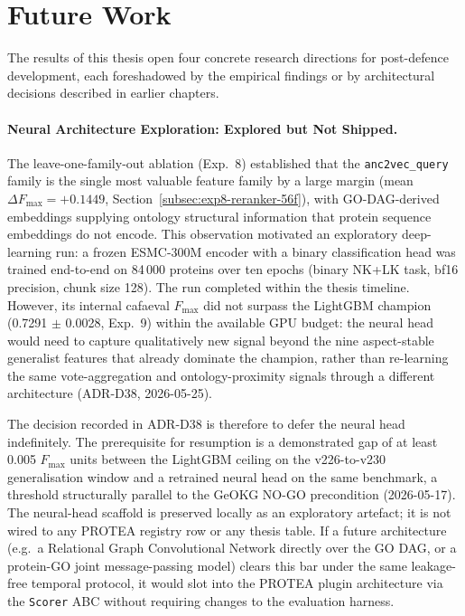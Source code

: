 \section{Future Work}
\label{sec:conclusion-future-work}

The results of this thesis open four concrete research directions for
post-defence development, each foreshadowed by the empirical findings or by
architectural decisions described in earlier chapters.

\paragraph{Neural Architecture Exploration: Explored but Not Shipped.}
\label{para:future-neural-boundary}

The leave-one-family-out ablation (Exp.~8) established that the
\texttt{anc2vec\_query} family is the single most valuable feature family by a
large margin (mean $\Delta F_{\max} = +0.1449$,
Section~\ref{subsec:exp8-reranker-56f}), with GO-DAG-derived embeddings
supplying ontology structural information that protein sequence embeddings do
not encode. This observation motivated an exploratory deep-learning run: a
frozen ESMC-300M encoder with a binary classification head was trained end-to-end
on 84\,000 proteins over ten epochs (binary NK+LK task, bf16 precision, chunk
size 128). The run completed within the thesis timeline. However, its internal
cafaeval $F_{\max}$ did not surpass the LightGBM champion (0.7291 $\pm$ 0.0028,
Exp.~9) within the available GPU budget: the neural head would need to capture
qualitatively new signal beyond the nine aspect-stable generalist features that
already dominate the champion, rather than re-learning the same vote-aggregation
and ontology-proximity signals through a different architecture (ADR-D38,
2026-05-25).

The decision recorded in ADR-D38 is therefore to defer the neural head
indefinitely. The prerequisite for resumption is a demonstrated gap of at
least 0.005 $F_{\max}$ units between the LightGBM ceiling on the
v226-to-v230 generalisation window and a retrained neural head on the same
benchmark, a threshold structurally parallel to the GeOKG NO-GO precondition
(2026-05-17). The neural-head scaffold is preserved locally as an exploratory
artefact; it is not wired to any PROTEA registry row or any thesis table.
If a future architecture (e.g.\ a Relational Graph Convolutional Network
directly over the GO DAG, or a protein-GO joint message-passing model) clears
this bar under the same leakage-free temporal protocol, it would slot into the
PROTEA plugin architecture via the \texttt{Scorer} ABC without requiring
changes to the evaluation harness.

